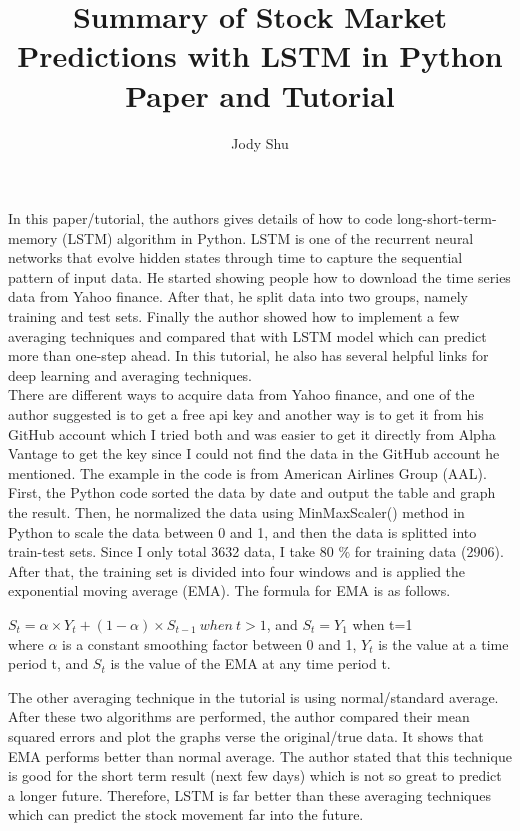 \documentclass[11pt, oneside]{article}   	%
\title{Summary of Stock Market Predictions with LSTM in Python Paper and Tutorial}
\author{Jody Shu}
\begin{document}
\begin{Large}
\maketitle

In this paper/tutorial, the authors gives details of how to code long-short-term-memory (LSTM) algorithm in Python.  LSTM is one of the recurrent neural networks that evolve hidden states through time to capture the sequential pattern of input data.  He started showing people how to download the time series data from Yahoo finance.  After that, he split data into two groups, namely training and test sets.  Finally the author showed how to implement a few averaging techniques and compared that with LSTM model which can predict more than one-step ahead.   In this tutorial, he also has several helpful links for deep learning and averaging techniques.  \\

There are different ways to acquire data from Yahoo finance, and one of the author suggested is to get a free api key and another way is to get it from his GitHub account which I tried both and was easier to get it directly from Alpha Vantage to get the key since I could not find the data in the GitHub account he mentioned.  The example in the code is from American Airlines Group (AAL).  First, the Python code sorted the data by date and output the table and graph the result.  Then, he normalized the data using MinMaxScaler() method in Python to scale the data between 0 and 1, and then the data is splitted into train-test sets.  Since I only total 3632 data, I take 80 $\%$ for training data (2906).  After that, the training set is divided into four windows and is applied the exponential moving average (EMA).  The formula for EMA is as follows.

$S_t=\alpha \times Y_t + (1-\alpha)\times S_{t-1} \ when \ t >1$, and $S_t=Y_1$ when t=1\\
where $\alpha$ is a constant smoothing factor between 0 and 1, $Y_t$ is the value at a time period t, and $S_t$ is the value of the EMA at any time period t.

The other averaging technique in the tutorial is using normal/standard average.  After these two algorithms are performed, the author compared their mean squared errors and plot the graphs verse the original/true data.  It shows that EMA performs better than normal average.  The author stated that this technique is good for the short term result (next few days) which is not so great to predict a longer future.  Therefore, LSTM is far better than these averaging techniques which can predict the stock movement far into the future.


\end{Large}
\end{document}
